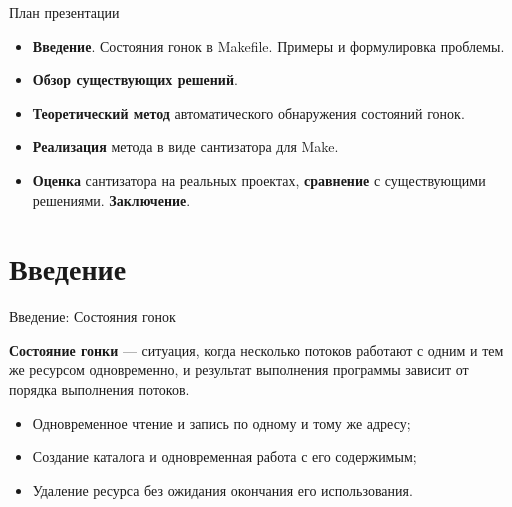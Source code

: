     \begin{frame}[label=current]{План презентации}
        \begin{itemize}
            \setlength\itemsep{1.1em}
            \item \textbf{Введение}. Состояния гонок в Makefile. Примеры и формулировка проблемы.
            \item \textbf{Обзор существующих решений}.
            \item \textbf{Теоретический метод} автоматического обнаружения состояний гонок.
            \item \textbf{Реализация} метода в виде сантизатора для Make.
            \item \textbf{Оценка} сантизатора на реальных проектах, \textbf{сравнение} с существующими решениями. \textbf{Заключение}.
        \end{itemize}

    \end{frame}


    \section{Введение}

    \begin{frame}[label=current]{Введение: Состояния гонок}

        \textbf{Состояние гонки} --- ситуация, когда несколько потоков работают с одним и тем же ресурсом одновременно,
        и результат выполнения программы зависит от порядка выполнения потоков.

        \begin{itemize}
            \item Одновременное чтение и запись по одному и тому же адресу;
            \item Создание каталога и одновременная работа с его содержимым;
            \item Удаление ресурса без ожидания окончания его использования.
        \end{itemize}


    \end{frame}

